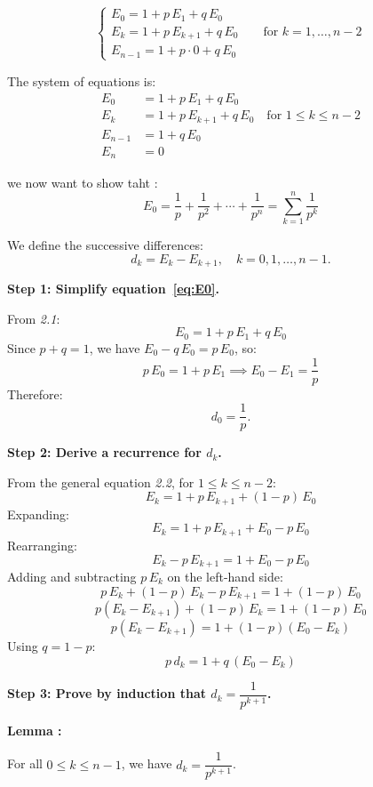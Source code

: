 \[
\begin{cases}
E_0 = 1 + p\,E_1 + q\,E_0 \\[6pt]
E_k = 1 + p\,E_{k+1} + q\,E_0 \qquad \text{for } k = 1, \dots, n-2 \\[6pt]
E_{n-1} = 1 + p \cdot 0 + q\,E_0
\end{cases}
\]

\bigskip



The system of equations is:
\begin{align}
    E_0 &= 1 + p\,E_1 + q\,E_0 \label{eq:E0}\\
    E_k &= 1 + p\,E_{k+1} + q\,E_0 \quad \text{for } 1 \leq k \leq n-2 \label{eq:Ek}\\
    E_{n-1} &= 1 + q\,E_0 \label{eq:En1}\\
    E_n &= 0 \label{eq:En}
\end{align}

we now want to show taht : 
\[
    E_0 = \frac{1}{p} + \frac{1}{p^2} + \cdots + \frac{1}{p^n} = \sum_{k=1}^{n} \frac{1}{p^k}
\]


We define the successive differences:
\[
    d_k = E_k - E_{k+1}, \quad k = 0, 1, \ldots, n-1.
\]

\medskip
\textbf{Step 1: Simplify equation~\eqref{eq:E0}.}

From \textit{2.1}:
\[
    E_0 = 1 + p\,E_1 + q\,E_0
\]
Since $p + q = 1$, we have $E_0 - q\,E_0 = p\,E_0$, so:
\[
    p\,E_0 = 1 + p\,E_1 \implies E_0 - E_1 = \frac{1}{p}
\]
Therefore:
\[
    d_0 = \frac{1}{p}.
\]

\medskip
\textbf{Step 2: Derive a recurrence for $d_k$.}

From the general equation \textit{2.2}, for $1 \leq k \leq n-2$:
\[
    E_k = 1 + p\,E_{k+1} + (1 - p)\,E_0
\]
Expanding:
\[
    E_k = 1 + p\,E_{k+1} + E_0 - p\,E_0
\]
Rearranging:
\[
    E_k - p\,E_{k+1} = 1 + E_0 - p\,E_0
\]
Adding and subtracting $p\,E_k$ on the left-hand side:
\[
    p\,E_k + (1-p)\,E_k - p\,E_{k+1} = 1 + (1-p)\,E_0
\]
\[
    p(E_k - E_{k+1}) + (1-p)\,E_k = 1 + (1-p)\,E_0
\]
\[
    p(E_k - E_{k+1}) = 1 + (1-p)(E_0 - E_k)
\]
Using $q = 1-p$:
\begin{equation} \label{eq:recurrence}
    p\,d_k = 1 + q\,(E_0 - E_k)
\end{equation}


\medskip
\textbf{Step 3: Prove by induction that $d_k = \dfrac{1}{p^{k+1}}$.}

  
\textbf{Lemma : }

For all $0 \leq k \leq n-1$, we have $d_k = \dfrac{1}{p^{k+1}}$.

